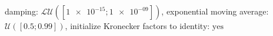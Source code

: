 damping: $\mathcal{LU}([\num[scientific-notation=true]{1e-15}; \num[scientific-notation=true]{1e-09}])$, exponential moving average: $\mathcal{U}([\num[scientific-notation=true]{0.5}; \num[scientific-notation=true]{0.99}])$, initialize Kronecker factors to identity: $\text{yes}$